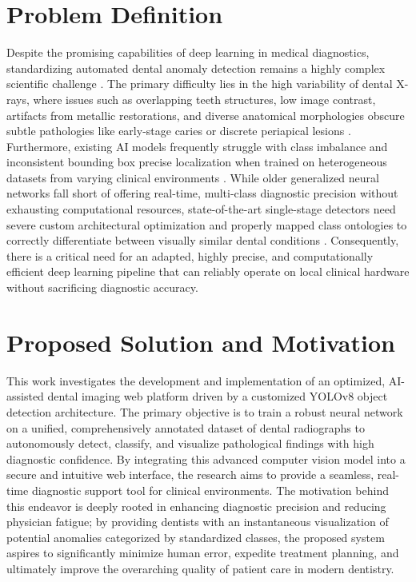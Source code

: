 \section{Problem Definition}
Despite the promising capabilities of deep learning in medical diagnostics, standardizing automated dental anomaly detection remains a highly complex scientific challenge \cite{haghanifar2020dental, jocher2023ultralytics, nguyen2023dental, schwendicke2020artificial}. The primary difficulty lies in the high variability of dental X-rays, where issues such as overlapping teeth structures, low image contrast, artifacts from metallic restorations, and diverse anatomical morphologies obscure subtle pathologies like early-stage caries or discrete periapical lesions \cite{lee2021challenges, orhan2020evaluation, tuzoff2019tooth}. Furthermore, existing AI models frequently struggle with class imbalance and inconsistent bounding box precise localization when trained on heterogeneous datasets from varying clinical environments \cite{pang2019libra, prados2020artificial, son2022performance}. While older generalized neural networks fall short of offering real-time, multi-class diagnostic precision without exhausting computational resources, state-of-the-art single-stage detectors need severe custom architectural optimization and properly mapped class ontologies to correctly differentiate between visually similar dental conditions \cite{tan2019efficientnet, xie2023survey}. Consequently, there is a critical need for an adapted, highly precise, and computationally efficient deep learning pipeline that can reliably operate on local clinical hardware without sacrificing diagnostic accuracy.

\section{Proposed Solution and Motivation}
This work investigates the development and implementation of an optimized, AI-assisted dental imaging web platform driven by a customized YOLOv8 object detection architecture. The primary objective is to train a robust neural network on a unified, comprehensively annotated dataset of dental radiographs to autonomously detect, classify, and visualize pathological findings with high diagnostic confidence. By integrating this advanced computer vision model into a secure and intuitive web interface, the research aims to provide a seamless, real-time diagnostic support tool for clinical environments. The motivation behind this endeavor is deeply rooted in enhancing diagnostic precision and reducing physician fatigue; by providing dentists with an instantaneous visualization of potential anomalies categorized by standardized classes, the proposed system aspires to significantly minimize human error, expedite treatment planning, and ultimately improve the overarching quality of patient care in modern dentistry.